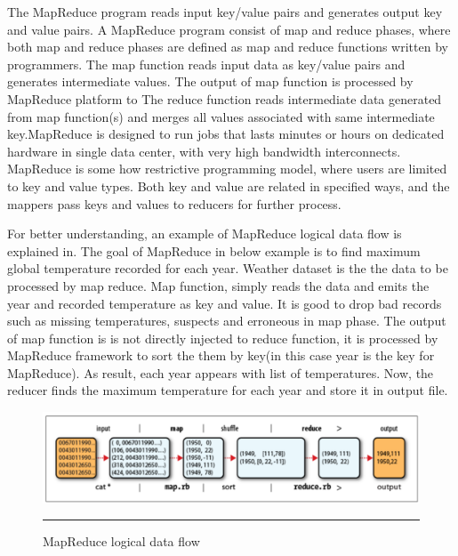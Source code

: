  The MapReduce program reads input key/value pairs and generates output key and value pairs. 
  A MapReduce program consist of map and reduce phases, where both map and reduce phases are defined as map and reduce functions written by programmers. The map function reads input data as  key/value pairs and generates intermediate values. The output of map function is processed by MapReduce platform to  The reduce function reads intermediate data generated from map function(s) and merges all values associated with same intermediate key.MapReduce is designed to run jobs that lasts minutes or hours on dedicated hardware in single data center, with very high bandwidth interconnects.\cite{tom3}\\

 MapReduce is some how restrictive programming model, where users are limited to key and value types. Both key and value are related in specified ways, and the mappers pass keys and values to reducers for further process.     

For better understanding, an example of MapReduce logical data flow is explained in. The goal of MapReduce in below example is to find maximum global temperature recorded for each year. Weather dataset is the the data to be processed by map reduce. Map function, simply reads the data and emits the year and recorded temperature as key and value. It is good to drop bad records such as missing temperatures, suspects and erroneous in map phase. The output of map function is is not directly injected to reduce function, it is processed by MapReduce framework to sort the them by key(in this case year is the key for MapReduce). As result, each year appears with list of temperatures. Now, the reducer finds the maximum temperature for each year and store it in output file.  
  
\begin{figure}[htbp]
  \centering
    \includegraphics[width=\textwidth,height=\textheight,keepaspectratio]{./Figures/map-reduce.pdf}
    \rule{35em}{0.5pt}
  \caption{MapReduce logical data flow \cite{tom3}}
  \label{fig:map-reduce}
\end{figure}


